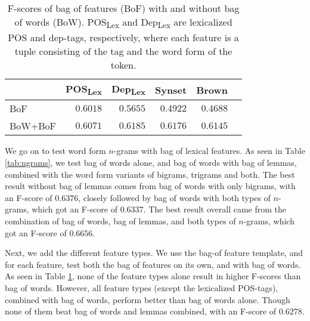 \documentclass[11pt,letterpaper]{article}
\begin{document}
\begin{table}
  \begin{smaller}    
  \begin{center}
    \begin{tabular}{lrrrrr}
      \toprule
      
     & POS\textsubscript{Lex} & Dep\textsubscript{Lex} & Synset & Brown\\ %
      \midrule
      BoF & $0.6018$ & $0.5655$ & $0.4922$ & $0.4688$ \\ %
      BoW+BoF & $0.6071$ & $0.6185$ & $0.6176$ & $0.6145$\\ %
      
      \bottomrule

    \end{tabular}
  \end{center}
  \caption{F-scores of bag of features (BoF) with and without bag of words (BoW). POS\textsubscript{Lex} and Dep\textsubscript{Lex} are lexicalized POS and dep-tags, respectively, where each feature is a tuple consisting of the tag and the word form of the token.}
  \label{tab:bagOfFeatures}
  \end{smaller}
\end{table}



We go on to test word form $n$-grams with bag of lexical features. As seen in Table \ref{tab:ngrams}, we test bag of words alone, and bag of words with bag of lemmas, combined with the word form variants of bigrams, trigrams and both. The best result without bag of lemmas comes from bag of words with only bigrams, with an F-score of $0.6376$, closely followed by bag of words with both types of $n$-grams, which got an F-score of $0.6337$. The best result overall came from the combination of bag of words, bag of lemmas, and both types of $n$-grams, which got an F-score of $0.6656$.


Next, we add the different feature types. We use the bag-of feature template, and for each feature, test both the bag of features on its own, and with bag of words. As seen in Table \ref{tab:bagOfFeatures}, none of the feature types alone result in higher F-scores than bag of words. However, all feature types (except the lexicalized POS-tags), combined with bag of words, perform better than bag of words alone. Though none of them beat bag of words and lemmas combined, with an F-score of $0.6278$.
\end{document}

